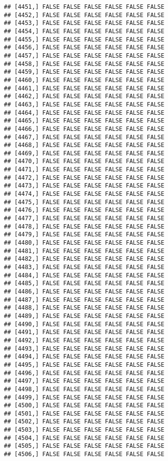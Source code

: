 \documentclass[
]{article}
\begin{document}
\begin{verbatim}
## [4451,] FALSE FALSE FALSE FALSE FALSE FALSE
## [4452,] FALSE FALSE FALSE FALSE FALSE FALSE
## [4453,] FALSE FALSE FALSE FALSE FALSE FALSE
## [4454,] FALSE FALSE FALSE FALSE FALSE FALSE
## [4455,] FALSE FALSE FALSE FALSE FALSE FALSE
## [4456,] FALSE FALSE FALSE FALSE FALSE FALSE
## [4457,] FALSE FALSE FALSE FALSE FALSE FALSE
## [4458,] FALSE FALSE FALSE FALSE FALSE FALSE
## [4459,] FALSE FALSE FALSE FALSE FALSE FALSE
## [4460,] FALSE FALSE FALSE FALSE FALSE FALSE
## [4461,] FALSE FALSE FALSE FALSE FALSE FALSE
## [4462,] FALSE FALSE FALSE FALSE FALSE FALSE
## [4463,] FALSE FALSE FALSE FALSE FALSE FALSE
## [4464,] FALSE FALSE FALSE FALSE FALSE FALSE
## [4465,] FALSE FALSE FALSE FALSE FALSE FALSE
## [4466,] FALSE FALSE FALSE FALSE FALSE FALSE
## [4467,] FALSE FALSE FALSE FALSE FALSE FALSE
## [4468,] FALSE FALSE FALSE FALSE FALSE FALSE
## [4469,] FALSE FALSE FALSE FALSE FALSE FALSE
## [4470,] FALSE FALSE FALSE FALSE FALSE FALSE
## [4471,] FALSE FALSE FALSE FALSE FALSE FALSE
## [4472,] FALSE FALSE FALSE FALSE FALSE FALSE
## [4473,] FALSE FALSE FALSE FALSE FALSE FALSE
## [4474,] FALSE FALSE FALSE FALSE FALSE FALSE
## [4475,] FALSE FALSE FALSE FALSE FALSE FALSE
## [4476,] FALSE FALSE FALSE FALSE FALSE FALSE
## [4477,] FALSE FALSE FALSE FALSE FALSE FALSE
## [4478,] FALSE FALSE FALSE FALSE FALSE FALSE
## [4479,] FALSE FALSE FALSE FALSE FALSE FALSE
## [4480,] FALSE FALSE FALSE FALSE FALSE FALSE
## [4481,] FALSE FALSE FALSE FALSE FALSE FALSE
## [4482,] FALSE FALSE FALSE FALSE FALSE FALSE
## [4483,] FALSE FALSE FALSE FALSE FALSE FALSE
## [4484,] FALSE FALSE FALSE FALSE FALSE FALSE
## [4485,] FALSE FALSE FALSE FALSE FALSE FALSE
## [4486,] FALSE FALSE FALSE FALSE FALSE FALSE
## [4487,] FALSE FALSE FALSE FALSE FALSE FALSE
## [4488,] FALSE FALSE FALSE FALSE FALSE FALSE
## [4489,] FALSE FALSE FALSE FALSE FALSE FALSE
## [4490,] FALSE FALSE FALSE FALSE FALSE FALSE
## [4491,] FALSE FALSE FALSE FALSE FALSE FALSE
## [4492,] FALSE FALSE FALSE FALSE FALSE FALSE
## [4493,] FALSE FALSE FALSE FALSE FALSE FALSE
## [4494,] FALSE FALSE FALSE FALSE FALSE FALSE
## [4495,] FALSE FALSE FALSE FALSE FALSE FALSE
## [4496,] FALSE FALSE FALSE FALSE FALSE FALSE
## [4497,] FALSE FALSE FALSE FALSE FALSE FALSE
## [4498,] FALSE FALSE FALSE FALSE FALSE FALSE
## [4499,] FALSE FALSE FALSE FALSE FALSE FALSE
## [4500,] FALSE FALSE FALSE FALSE FALSE FALSE
## [4501,] FALSE FALSE FALSE FALSE FALSE FALSE
## [4502,] FALSE FALSE FALSE FALSE FALSE FALSE
## [4503,] FALSE FALSE FALSE FALSE FALSE FALSE
## [4504,] FALSE FALSE FALSE FALSE FALSE FALSE
## [4505,] FALSE FALSE FALSE FALSE FALSE FALSE
## [4506,] FALSE FALSE FALSE FALSE FALSE FALSE

\end{verbatim}
\end{document}

